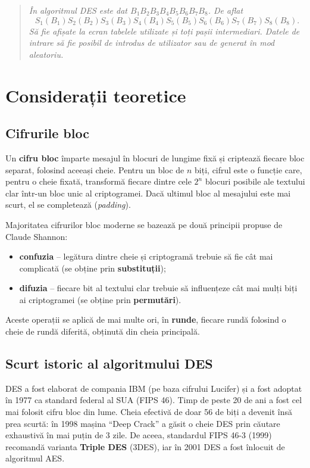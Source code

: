 \documentclass[12pt,a4paper]{article}
\begin{document}
\begin{quote}
\itshape
În algoritmul DES este dat $B_1B_2B_3B_4B_5B_6B_7B_8$. De aflat
\[
    S_1(B_1)S_2(B_2)S_3(B_3)S_4(B_4)S_5(B_5)S_6(B_6)S_7(B_7)S_8(B_8).
\]
Să fie afișate la ecran tabelele utilizate și toți pașii intermediari. Datele de
intrare să fie posibil de introdus de utilizator sau de generat în mod aleatoriu.
\end{quote}

\section{Considerații teoretice}

\subsection{Cifrurile bloc}

Un \textbf{cifru bloc} împarte mesajul în blocuri de lungime fixă și criptează
fiecare bloc separat, folosind aceeași cheie. Pentru un bloc de $n$ biți, cifrul
este o funcție care, pentru o cheie fixată, transformă fiecare dintre cele $2^n$
blocuri posibile ale textului clar într-un bloc unic al criptogramei. Dacă
ultimul bloc al mesajului este mai scurt, el se completează (\textit{padding}).

Majoritatea cifrurilor bloc moderne se bazează pe două principii propuse de
Claude Shannon:
\begin{itemize}
    \item \textbf{confuzia} -- legătura dintre cheie și criptogramă trebuie să fie
    cât mai complicată (se obține prin \textbf{substituții});
    \item \textbf{difuzia} -- fiecare bit al textului clar trebuie să influențeze
    cât mai mulți biți ai criptogramei (se obține prin \textbf{permutări}).
\end{itemize}
Aceste operații se aplică de mai multe ori, în \textbf{runde}, fiecare rundă
folosind o cheie de rundă diferită, obținută din cheia principală.

\subsection{Scurt istoric al algoritmului DES}

DES a fost elaborat de compania IBM (pe baza cifrului Lucifer) și a fost adoptat
în 1977 ca standard federal al SUA (FIPS 46). Timp de peste 20 de ani a fost cel
mai folosit cifru bloc din lume. Cheia efectivă de doar 56 de biți a devenit însă
prea scurtă: în 1998 mașina \enquote{Deep Crack} a găsit o cheie DES prin căutare
exhaustivă în mai puțin de 3 zile. De aceea, standardul FIPS 46-3 (1999)
recomandă varianta \textbf{Triple DES} (3DES), iar în 2001 DES a fost înlocuit de
algoritmul AES.
\end{document}
